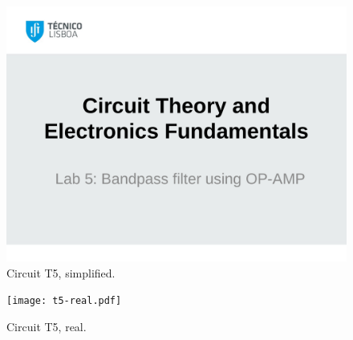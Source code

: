 \begin{figure}[ht!]
\centering
    \includegraphics[width=0.8\linewidth]{t5.pdf}
\caption{Circuit T5, simplified.}
\label{fig:t5}
\end{figure}

\begin{figure}[ht!]
\centering
    \texttt{[image: t5-real.pdf]}
\caption{Circuit T5, real.}
\label{fig:t5-real}
\end{figure}

\FloatBarrier
\clearpage
